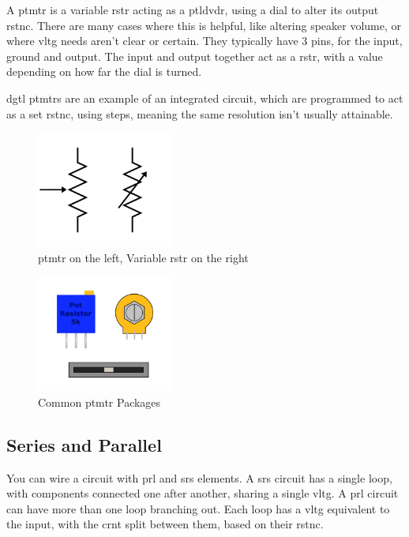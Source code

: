 \documentclass[a4paper,11pt]{report}
\begin{document}
A \gls{ptmtr} is a variable \gls{rstr} acting as a \gls{ptldvdr}, using a dial to alter its output \gls{rstnc}. There are many cases where this is helpful, like altering speaker volume, or where \gls{vltg} needs aren't clear or certain. They typically have 3 pins, for the input, ground and output. The input and output together act as a \gls{rstr}, with a value depending on how far the dial is turned.

\gls{dgtl} \gls{ptmtr}s are an example of an integrated circuit, which are programmed to act as a set \gls{rstnc}, using steps, meaning the same resolution isn't usually attainable.

\begin{figure}[H]
\centering
\includegraphics[width=0.4\textwidth]{potentiometer1}
\caption{\gls{ptmtr} on the left, Variable \gls{rstr} on the right}
\end{figure}

\begin{figure}[H]
\centering
\includegraphics[width=0.4\textwidth]{potentiometerPackages}
\caption{Common \gls{ptmtr} Packages}
\end{figure}

\vspace*{1\baselineskip}

\subsection{Series and Parallel}

You can wire a circuit with \gls{prl} and \gls{srs} elements. A \gls{srs} circuit has a single loop, with components connected one after another, sharing a single \gls{vltg}. A \gls{prl} circuit can have more than one loop branching out. Each loop has a \gls{vltg} equivalent to the input, with the \gls{crnt} split between them, based on their \gls{rstnc}.
\end{document}
